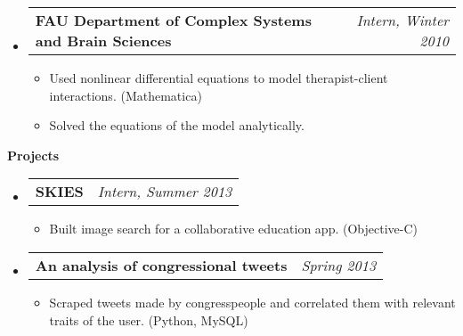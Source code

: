 \documentclass[letterpaper,10pt]{article}
\makeatletter
\newcommand{\resitem}[1]{\item #1 \vspace{-2pt}}
\newcommand{\resheading}[1]{{\large \colorbox{mygrey}{\begin{minipage}{\textwidth}{\textbf{#1 \vphantom{p\^{E}}}}\end{minipage}}}}
\newcommand{\ressubheading}[4]{
\begin{tabular*}{7.0in}{l@{\extracolsep{\fill}}r}
		\textbf{#1} & \textit{#4} \\
\end{tabular*}\vspace{-6pt}}
\makeatother
\begin{document}
\begin{itemize}
\item
	\ressubheading{FAU Department of Complex Systems and Brain Sciences}{Boca Raton, FL}{Research Intern}{Intern, Winter 2010}
	\begin{itemize}
		\resitem{Used nonlinear differential equations to model therapist-client interactions.  (Mathematica)}
		\resitem{Solved the equations of the model analytically.}
	\end{itemize}


\end{itemize}

\resheading{Projects}
\begin{itemize}
\item
	\ressubheading{SKIES}{Pasadena, CA}{Intern}{Intern, Summer 2013}
	\begin{itemize}
		\resitem{Built image search for a collaborative education app.  (Objective-C)}
	\end{itemize}

\item
	\ressubheading{An analysis of congressional tweets}{Pasadena, CA}{Student}{Spring 2013}
	\begin{itemize}
		\resitem{Scraped tweets made by congresspeople and correlated them with relevant traits of the user.  (Python, MySQL)}
	\end{itemize}
\end{itemize}
\end{document}
